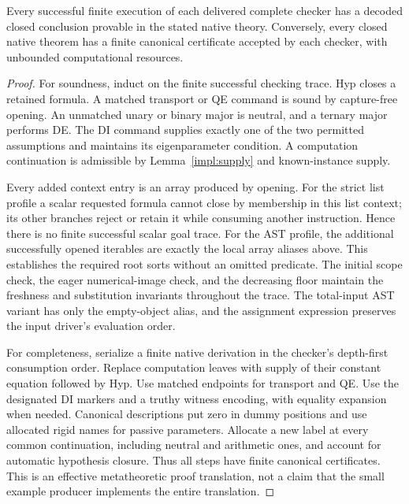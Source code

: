 \begin{theorem}\label{impl:correspondence}
Every successful finite execution of each delivered complete checker has a
decoded closed conclusion provable in the stated native theory.
Conversely, every closed native theorem has a finite canonical certificate
accepted by each checker, with unbounded computational resources.
\end{theorem}
\begin{proof}
For soundness, induct on the finite successful checking trace. Hyp closes
a retained formula. A matched transport or QE command is sound by
capture-free opening. An unmatched unary or binary major is neutral,
and a ternary major performs DE. The DI command supplies exactly one of
the two permitted assumptions and maintains its eigenparameter condition.
A computation continuation is admissible by Lemma~\ref{impl:supply} and
known-instance supply.

Every added context entry is an array produced by opening. For the
strict list profile a scalar requested formula cannot close by membership
in this list context; its other branches reject or retain it while
consuming another instruction. Hence there is no finite successful scalar
goal trace. For the AST profile, the additional successfully opened
iterables are exactly the local array aliases above. This establishes the
required root sorts without an omitted predicate. The initial scope check,
the eager numerical-image check, and the decreasing floor maintain the
freshness and substitution invariants throughout the trace.
The total-input AST variant has only the empty-object alias, and the
assignment expression preserves the input driver's evaluation order.

For completeness, serialize a finite native derivation in the checker's
depth-first consumption order. Replace computation leaves with supply of
their constant equation followed by Hyp. Use matched endpoints for
transport and QE. Use the designated DI markers and a truthy witness
encoding, with equality expansion when needed. Canonical descriptions put
zero in dummy positions and use allocated rigid names for passive
parameters. Allocate a new label at every common continuation, including
neutral and arithmetic ones, and account for automatic hypothesis closure.
Thus all steps have finite canonical certificates. This is an effective
metatheoretic proof translation, not a claim that the small example
producer implements the entire translation.
\end{proof}

